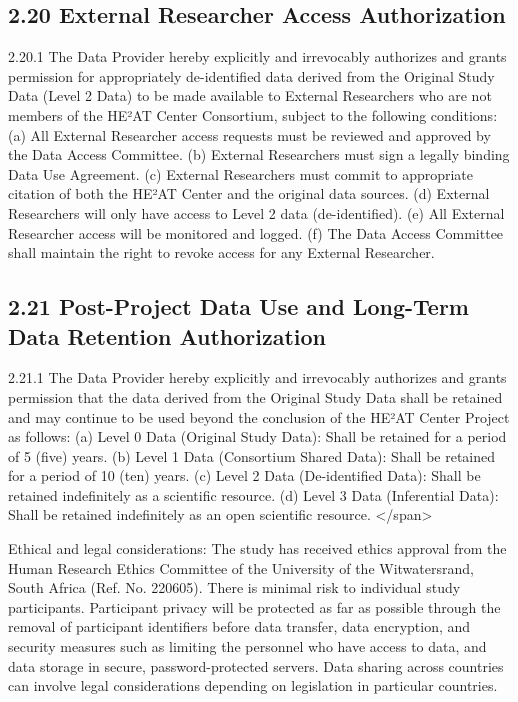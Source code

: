 \documentclass[12pt,letterpaper]{article}
\begin{document}
\subsection*{2.20 External Researcher Access Authorization}

2.20.1 The Data Provider hereby explicitly and irrevocably authorizes and grants permission for appropriately de-identified data derived from the Original Study Data (Level 2 Data) to be made available to External Researchers who are not members of the HE²AT Center Consortium, subject to the following conditions: (a) All External Researcher access requests must be reviewed and approved by the Data Access Committee. (b) External Researchers must sign a legally binding Data Use Agreement. (c) External Researchers must commit to appropriate citation of both the HE²AT Center and the original data sources. (d) External Researchers will only have access to Level 2 data (de-identified). (e) All External Researcher access will be monitored and logged. (f) The Data Access Committee shall maintain the right to revoke access for any External Researcher.

\subsection*{2.21 Post-Project Data Use and Long-Term Data Retention Authorization}

2.21.1 The Data Provider hereby explicitly and irrevocably authorizes and grants permission that the data derived from the Original Study Data shall be retained and may continue to be used beyond the conclusion of the HE²AT Center Project as follows: (a) Level 0 Data (Original Study Data): Shall be retained for a period of 5 (five) years. (b) Level 1 Data (Consortium Shared Data): Shall be retained for a period of 10 (ten) years. (c) Level 2 Data (De-identified Data): Shall be retained indefinitely as a scientific resource. (d) Level 3 Data (Inferential Data): Shall be retained indefinitely as an open scientific resource. </span>

Ethical and legal considerations: The study has received ethics approval from the Human Research Ethics Committee of the University of the Witwatersrand, South Africa (Ref. No. 220605). There is minimal risk to individual study participants. Participant privacy will be protected as far as possible through the removal of participant identifiers before data transfer, data encryption, and security measures such as limiting the personnel who have access to data, and data storage in secure, password-protected servers. Data sharing across countries can involve legal considerations depending on legislation in particular countries.
\end{document}
